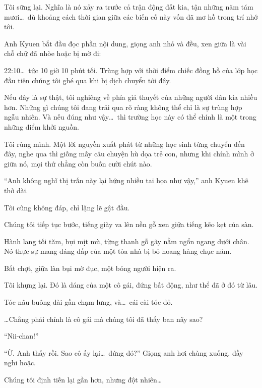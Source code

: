 \documentclass[../main.tex]{subfiles}
\begin{document}
Tôi sững lại. Nghĩa là nó xảy ra trước cả trận động đất kia, tận những năm tám mươi\dots\ dù khoảng cách thời gian giữa các biến cố này vốn đã mơ hồ trong trí nhớ tôi.

Anh Kyuen bắt đầu đọc phần nội dung, giọng anh nhỏ và đều, xen giữa là vài chỗ chữ đã nhòe hoặc bị mờ đi:


22:10\dots\ tức 10 giờ 10 phút tối. Trùng hợp với thời điểm chiếc đồng hồ của lớp học đầu tiên chúng tôi ghé qua khi bị dịch chuyển tới đây.

Nếu đây là sự thật, tôi nghiêng về phía giả thuyết của những người dân kia nhiều hơn. Những gì chúng tôi đang trải qua rõ ràng không thể chỉ là sự trùng hợp ngẫu nhiên. Và nếu đúng như vậy\dots\ thì trường học này có thể chính là một trong những điểm khởi nguồn.

Tôi rùng mình. Một lời nguyền xuất phát từ những học sinh từng chuyển đến đây, nghe qua thì giống mấy câu chuyện hù dọa trẻ con, nhưng khi chính mình ở giữa nó, mọi thứ chẳng còn buồn cười chút nào.

``Anh không nghĩ thị trấn này lại hứng nhiều tai họa như vậy,'' anh Kyuen khẽ thở dài.

Tôi cũng không đáp, chỉ lặng lẽ gật đầu.

Chúng tôi tiếp tục bước, tiếng giày va lên nền gỗ xen giữa tiếng kẽo kẹt của sàn.

Hành lang tối tăm, bụi mịt mù, từng thanh gỗ gãy nằm ngổn ngang dưới chân. Nó thực sự mang dáng dấp của một tòa nhà bị bỏ hoang hàng chục năm.

Bất chợt, giữa làn bụi mờ đục, một bóng người hiện ra.

Tôi khựng lại. Đó là dáng của một cô gái, đứng bất động, như thể đã ở đó từ lâu.

Tóc nâu buông dài gần chạm lưng, và\dots\ cái cài tóc đỏ.

\dots Chẳng phải chính là cô gái mà chúng tôi đã thấy ban nãy sao?

``Nii-chan!''

``Ừ. Anh thấy rồi. Sao cô ấy lại\dots\ đứng đó?'' Giọng anh hơi chùng xuống, đầy nghi hoặc.

Chúng tôi định tiến lại gần hơn, nhưng đột nhiên\dots
\end{document}
